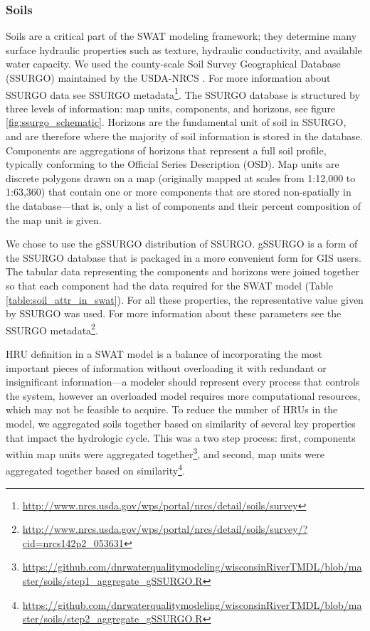 \subsubsection{Soils}
Soils are a critical part of the SWAT modeling framework; they determine many
surface hydraulic properties such as texture, hydraulic conductivity, and
available water capacity. We used the county-scale Soil Survey Geographical
Database (SSURGO) maintained by the USDA-NRCS \citep{staff_gridded_2014}. For more information about SSURGO
data see SSURGO metadata\footnote{\url{http://www.nrcs.usda.gov/wps/portal/nrcs/detail/soils/survey}}.
The SSURGO database is structured by three levels of information: map units,
components, and horizons, see figure \ref{fig:ssurgo_schematic}. Horizons are the fundamental unit of soil in SSURGO, and are
therefore where the majority of soil information is stored in the database.
Components are aggregations of horizons that represent a full soil profile,
typically conforming to the Official Series Description (OSD). Map units
are discrete polygons drawn on a map (originally mapped at scales from 1:12,000
to 1:63,360) that contain one or more components that are stored non-spatially
in the database---that is, only a list of components and their percent
composition of the map unit is given. 

We chose to use the gSSURGO distribution of SSURGO. gSSURGO is a form of the SSURGO database that is packaged in a more convenient form for GIS users. The tabular data representing the components and
horizons were joined together so that each component had the data required for
the SWAT model (Table \ref{table:soil_attr_in_swat}). For all these properties, the representative value given by
SSURGO was used. For more information about these parameters see the SSURGO
metadata\footnote{\url{http://www.nrcs.usda.gov/wps/portal/nrcs/detail/soils/survey/?cid=nrcs142p2_053631}}.

HRU definition in a SWAT model is a balance of incorporating the most important
pieces of information without overloading it with redundant or insignificant
information---a modeler should represent every process that controls the system,
however an overloaded model requires more computational resources, which may not
be feasible to acquire. To reduce the number of HRUs in the model, we aggregated
soils together based on similarity of several key properties that impact the
hydrologic cycle. This was a two step process: first, components within map
units were aggregated
together\footnote{\url{https://github.com/dnrwaterqualitymodeling/wisconsinRiverTMDL/blob/master/soils/step1_aggregate_gSSURGO.R}},
and second, map units were aggregated together based on
similarity\footnote{\url{https://github.com/dnrwaterqualitymodeling/wisconsinRiverTMDL/blob/master/soils/step2_aggregate_gSSURGO.R}}.

